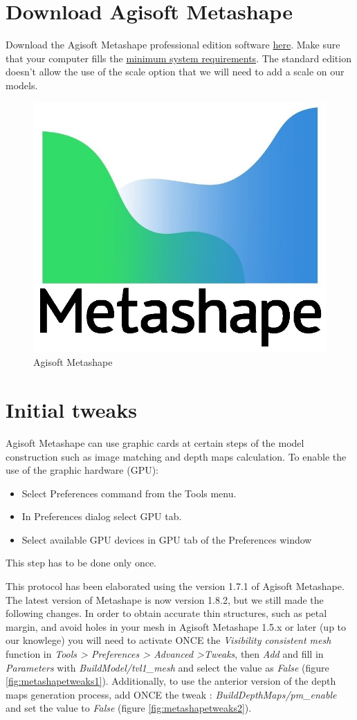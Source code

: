 \documentclass[
]{book}
\begin{document}
\hypertarget{download-agisoft-metashape}{%
\section{Download Agisoft Metashape}\label{download-agisoft-metashape}}

Download the Agisoft Metashape professional edition software
\href{https://www.agisoft.com/downloads/installer/}{here}. Make sure that
your computer fills the \href{https://www.agisoft.com/downloads/system-requirements/}{minimum system
requirements}.
The standard edition doesn't allow the use of the scale option that we
will need to add a scale on our models.

\begin{figure}

{\centering \includegraphics[width=0.2\linewidth]{Figures/logo_metashape} 

}

\caption{Agisoft Metashape}\label{fig:agisoft}
\end{figure}

\hypertarget{initial-tweaks}{%
\section{Initial tweaks}\label{initial-tweaks}}

Agisoft Metashape can use graphic cards at certain steps of the model
construction such as image matching and depth maps calculation. To
enable the use of the graphic hardware (GPU):

\begin{itemize}
\item
  Select Preferences command from the Tools menu.
\item
  In Preferences dialog select GPU tab.
\item
  Select available GPU devices in GPU tab of the Preferences window
\end{itemize}

This step has to be done only once.

This protocol has been elaborated using the version 1.7.1 of Agisoft
Metashape. The latest version of Metashape is now version 1.8.2, but we
still made the following changes. In order to obtain accurate thin
structures, such as petal margin, and avoid holes in your mesh in
Agisoft Metashape 1.5.x or later (up to our knowlege) you will need to
activate ONCE the \emph{Visibility consistent mesh} function in \emph{Tools \textgreater{}
Preferences \textgreater{} Advanced \textgreater Tweaks}, then \emph{Add} and fill in \emph{Parameters}
with \emph{BuildModel/tvl1\_mesh} and select the value as \emph{False} (figure \ref{fig:metashapetweaks1}). Additionally, to use the anterior
version of the depth maps generation process, add ONCE the tweak :
\emph{BuildDepthMaps/pm\_enable} and set the value to \emph{False} (figure \ref{fig:metashapetweaks2}).
\end{document}
